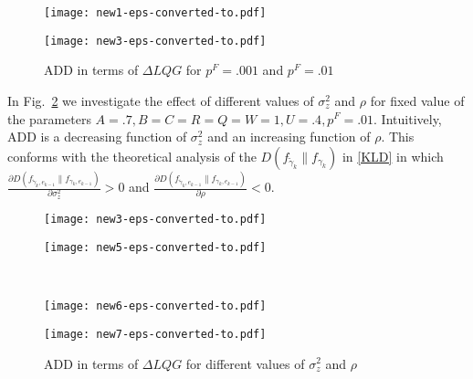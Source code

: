 \documentclass[journal,10pt]{IEEEtran}
\begin{document}
\begin{figure}[htbp]
\centering
\begin{minipage}[t]{\columnwidth}
\texttt{[image: new1-eps-converted-to.pdf]} 
\end{minipage}%
\hfill%
\begin{minipage}[t]{\columnwidth}
\texttt{[image: new3-eps-converted-to.pdf]}
\end{minipage}

 \caption{\footnotesize{ADD in terms of $\Delta LQG$ for $p^{F}=.001$ and $p^{F}=.01$}}
\label{fig1}
\end{figure}

In Fig.~\ref{fig2} we investigate the effect of different values of
$\sigma_{z}^{2}$ and $\rho$ for fixed value of the parameters $A=.7,
B=C=R=Q=W=1, U=.4,p^{F}=.01$. Intuitively, ADD is a decreasing
function of $\sigma_{z}^{2}$ and an increasing function of $\rho$.
This conforms with the theoretical analysis of the $D(f_{\widetilde{\gamma}_{k}}\|f_{\gamma_{k}})$ in
\eqref{KLD} in which $\frac{\partial D(f_{\widetilde{\gamma}_{k}, e_{k-1}}\|f_{\gamma_{k}, e_{k-1}})}{\partial
\sigma_{z}^{2}}>0$ and $\frac{\partial D(f_{\widetilde{\gamma}_{k}, e_{k-1}}\|f_{\gamma_{k}, e_{k-1}})}{\partial
\rho}<0$.

\begin{figure}[htbp]
\centering
\begin{minipage}[t]{\columnwidth}
\texttt{[image: new3-eps-converted-to.pdf]} 
\end{minipage}%
\hfill%
\begin{minipage}[t]{\columnwidth}
\texttt{[image: new5-eps-converted-to.pdf]}
\end{minipage}
\\
\begin{minipage}[t]{\columnwidth}
\texttt{[image: new6-eps-converted-to.pdf]} 
\end{minipage}
\hfill%
\begin{minipage}[t]{\columnwidth}
\texttt{[image: new7-eps-converted-to.pdf]}
\end{minipage}
\caption{\footnotesize{\footnotesize{ADD in terms of $\Delta LQG$ for different values of $\sigma_{z}^{2}$ and $\rho$}} }
\label{fig2}
\end{figure}
\end{document}
